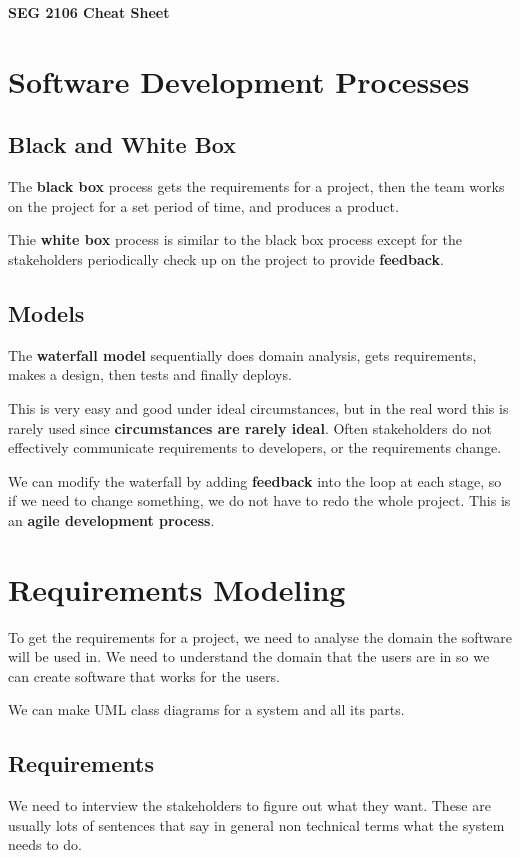 \documentclass[12pt,letterpaper]{article} \usepackage{amsmath} \usepackage{graphicx} \usepackage[margin=1in]{geometry} \usepackage{longtable}  \usepackage{amssymb}
\begin{document}
	
	\begin{center}
		\Large\textbf{SEG 2106 Cheat Sheet} \\
		\vspace{0.5em}
	\end{center}
	
	\section {Software Development Processes}
	\subsection{Black and White Box}
	The \textbf{black box} process gets the requirements for a project, then the team works on the project for a set period of time, and produces a product. 
	
	Thie \textbf{white box} process is similar to the black box process except for the stakeholders periodically check up on the project to provide \textbf{feedback}. 
	
	\subsection{Models}
	The \textbf{waterfall model} sequentially does domain analysis, gets requirements, makes a design, then tests and finally deploys. 
	
	This is very easy and good under ideal circumstances, but in the real word this is rarely used since \textbf{circumstances are rarely ideal}. Often stakeholders do not effectively communicate requirements to developers, or the requirements change. 
	
	We can modify the waterfall by adding \textbf{feedback} into the loop at each stage, so if we need to change something, we do not have to redo the whole project. This is an \textbf{agile development process}. 
	
	\section{Requirements Modeling}
	To get the requirements for a project, we need to analyse the domain the software will be used in. We need to understand the domain that the users are in so we can create software that works for the users. 
	
	We can make UML class diagrams for a system and all its parts. 
	
	\subsection{Requirements}
	We need to interview the stakeholders to figure out what they want. These are usually lots of sentences that say in general non technical terms what the system needs to do. 
	
\end{document}
